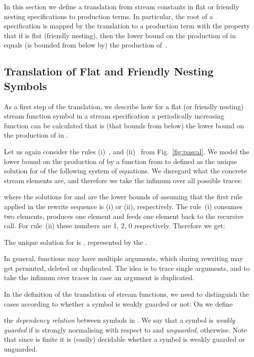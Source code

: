 In this section we define a translation
from stream constants in flat
or friendly nesting specifications to production terms.
In particular, the root  of a specification 
is mapped by the translation to a production term 
with the property that if\/  is flat (friendly nesting),
then the \daob{} lower bound on the production of  in 
equals (is bounded from below by)
the production of~.

\subsection{Translation of Flat and Friendly Nesting Symbols}\label{sec:translation:subsec:functions}





As a first step of the translation,
we describe how for a flat (or friendly nesting)
stream function symbol  in a stream specification 
a periodically increasing function 
can be calculated
that is (that bounds from below)
the \daob{} lower bound on the production of 
in . 

Let us again consider the rules
(i)~,
and
(ii)~
  from Fig.~\ref{fig:pascal}.
We model the \daob{} lower bound on the production of 
by a function from  to  defined as the unique solution for  of the following system of equations.\label{transl:Pascal:f}
We disregard what the concrete stream elements are,
and therefore we take the infimum over all possible traces:

where the solutions for  and 
are the \daob{} lower bounds of  assuming
that the first rule applied in the rewrite sequence is (i) or (ii), respectively.
The rule~(i) consumes two elements, produces one element
and feeds one element back to the recursive call.
For rule~(ii) these numbers are 1, 2, 0 respectively.
Therefore we get:

The unique solution for  is ,
represented by the \ioterm{} . \label{trans:pascal:f}

In general, functions may have multiple arguments,
which during rewriting may get permuted, deleted or duplicated.
The idea is to trace single arguments, and to take the infimum
over traces in case an argument is duplicated.

In the definition of the translation of stream functions,
we need to distinguish the cases according to whether a symbol is weakly guarded or not:
On  we define

the \emph{dependency relation} between symbols in .
We say that a symbol  is \emph{weakly guarded}
if  is strongly normalising with respect to 
and \emph{unguarded}, otherwise.
Note that since  is finite it is (easily) decidable whether
a symbol  is weakly guarded or unguarded.


